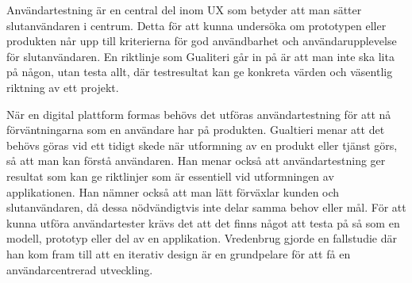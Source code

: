 Användartestning är en central del inom UX som betyder att man sätter slutanvändaren i centrum. Detta för att kunna undersöka om prototypen eller produkten når upp till kriterierna för god användbarhet och användarupplevelse för slutanvändaren\cite{Gualtieri2009BestDesign}.  En riktlinje som Gualiteri går in på är att man inte ska lita på någon, utan testa allt, där testresultat kan ge konkreta värden och väsentlig riktning av ett projekt\cite{Gualtieri2009BestDesign}.  
\newline
 
När en digital plattform formas behövs det utföras användartestning för att nå förväntningarna som en användare har på produkten. Gualtieri \cite{Gualtieri2009BestDesign} menar att det behövs göras vid ett tidigt skede när utformning av en produkt eller tjänst görs, så att man kan förstå användaren. Han menar också att användartestning ger resultat som kan ge riktlinjer som är essentiell vid utformningen av applikationen. Han nämner också att man lätt förväxlar kunden och slutanvändaren, då dessa nödvändigtvis inte delar samma behov eller mål. För att kunna utföra användartester krävs det att det finns något att testa på så som en modell, prototyp eller del av en applikation\cite{Gualtieri2009BestDesign}. Vredenbrug \cite{Vredenburg2002APractice} gjorde en fallstudie där han kom fram till att en iterativ design är en grundpelare för att få en användarcentrerad utveckling. 
\newline

